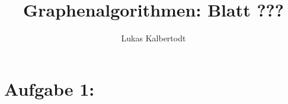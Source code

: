 \documentclass[11pt]{scrartcl}  %
\title{Graphenalgorithmen: Blatt ???}
\author{Lukas Kalbertodt}
\begin{document}
\maketitle


\section*{Aufgabe 1:}
\end{document}
